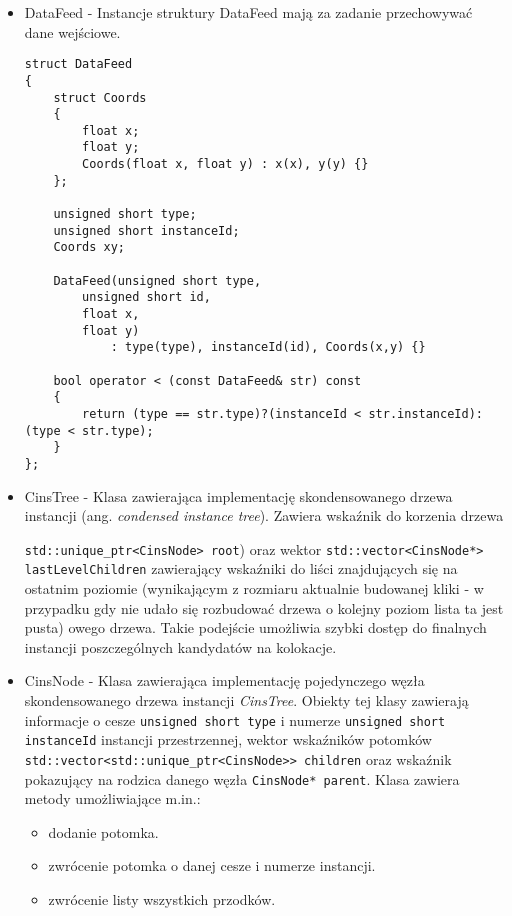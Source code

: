 \documentclass[12pt]{article}
\def\inline{\lstinline[basicstyle=\ttfamily,keywordstyle={}]}
\begin{document}
\begin{itemize}
\item DataFeed - Instancje struktury DataFeed mają za zadanie przechowywać dane wejściowe.

\begin{minipage}{\linewidth}
\begin{lstlisting}[caption={Kod struktury DataFeed}]
struct DataFeed
{
    struct Coords
    {
        float x;
        float y;
        Coords(float x, float y) : x(x), y(y) {}
    };
    
	unsigned short type;
	unsigned short instanceId;
	Coords xy;
    
	DataFeed(unsigned short type,
        unsigned short id,
        float x,
        float y)
    		: type(type), instanceId(id), Coords(x,y) {}

	bool operator < (const DataFeed& str) const
	{
		return (type == str.type)?(instanceId < str.instanceId):(type < str.type);
	}
};
\end{lstlisting}
\end{minipage}

\item CinsTree - Klasa zawierająca implementację skondensowanego drzewa instancji (ang. \textit{condensed instance tree}). Zawiera wskaźnik do korzenia drzewa \raggedright \inline{std::unique_ptr<CinsNode> root}) oraz wektor \inline{std::vector<CinsNode*> lastLevelChildren} zawierający wskaźniki do liści znajdujących się na ostatnim poziomie (wynikającym z rozmiaru aktualnie budowanej kliki - w przypadku gdy nie udało się rozbudować drzewa o kolejny poziom lista ta jest pusta) owego drzewa. Takie podejście umożliwia szybki dostęp do finalnych instancji poszczególnych kandydatów na kolokacje.

\item CinsNode - Klasa zawierająca implementację pojedynczego węzła skondensowanego drzewa instancji \textit{CinsTree}. Obiekty tej klasy zawierają informacje o cesze \inline{unsigned short type} i numerze \inline{unsigned short instanceId} instancji przestrzennej, wektor wskaźników potomków \inline{std::vector<std::unique_ptr<CinsNode>> children} oraz wskaźnik pokazujący na rodzica danego węzła \inline{CinsNode* parent}. Klasa zawiera metody umożliwiające m.in.:

\begin{itemize}
\item dodanie potomka.
\item zwrócenie potomka o danej cesze i numerze instancji.
\item zwrócenie listy wszystkich przodków.
\end{itemize}


\end{itemize}
\end{document}
